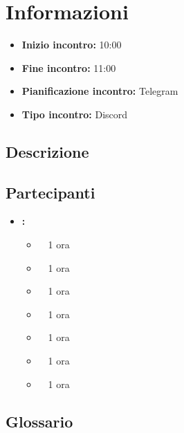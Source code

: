 \section{Informazioni}
\begin{itemize}
	\item \textbf{Inizio incontro:} 10:00
	\item \textbf{Fine incontro:} 11:00
	\item \textbf{Pianificazione incontro:} Telegram
	\item \textbf{Tipo incontro:} Discord
\end{itemize}

\subsection{Descrizione}
\DocDescription

\subsection{Partecipanti}

\begin{itemize}
	\item \textbf{\GroupName:}
	\begin{itemize}
		\item \tommaso \ \rightarrow\ 1 ora
		\item \riccardo \ \rightarrow\ 1 ora
		\item \raul \ \rightarrow\ 1 ora
		\item \martina \ \rightarrow\ 1 ora
		\item \sebastiano \ \rightarrow\ 1 ora
		\item \mattia \ \rightarrow\ 1 ora
		\item \marco \ \rightarrow\ 1 ora
	\end{itemize}
\end{itemize}

\subsection{Glossario}
\GlossarioIntroduzione

\clearpage